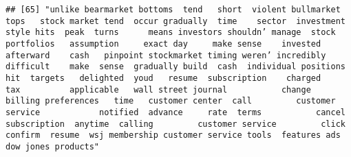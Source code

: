 \documentclass[
]{article}
\begin{document}
\begin{verbatim}
## [65] "unlike bearmarket bottoms  tend   short  violent bullmarket tops   stock market tend  occur gradually  time    sector  investment style hits  peak  turns      means investors shouldn’ manage  stock portfolios   assumption     exact day     make sense    invested  afterward    cash   pinpoint stockmarket timing weren’ incredibly difficult    make  sense  gradually build  cash  individual positions hit  targets   delighted  youd   resume  subscription    charged           tax          applicable   wall street journal           change  billing preferences   time   customer center  call         customer service            notified  advance     rate  terms           cancel  subscription  anytime  calling         customer service         click confirm  resume  wsj membership customer service tools  features ads  dow jones products"                                                                                                                                                                                                                                                                                                                                                                                                                                                                                                                                                                                                                                                                                                                                                                                                                                                                                                                                                                                                                                                                                                                                                                                                                                                                                                                                                                                                                                                                                                                                                                                                                                                                                                                                                                                                                                                                                                                                                                                                                                                                                                                                                                                                                                                                                                                                                                                                                                                                                                                                                                         
\end{verbatim}
\end{document}
